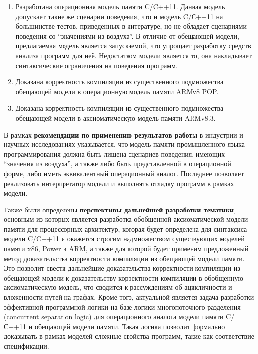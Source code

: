 \begin{enumerate}
  \item Разработана операционная модель памяти C/C++11.
    Данная модель допускает такие же сценарии поведения, что и модель C/С++11 на большинстве
    тестов, приведенных в литературе, но не обладает сценариями поведения со ``значениями из воздуха''.
    В отличие от обещающей модели, предлагаемая модель является запускаемой, что упрощает
    разработку средств анализа программ для неё. Недостатком модели является то,
    она накладывает синтаксические ограничения на поведения программ.
  \item Доказана корректность компиляции из существенного подмножества обещающей модели в операционную модель
    памяти ARMv8 POP.
  \item Доказана корректность компиляции из существенного подмножества обещающей модели в
    аксиоматическую модель памяти ARMv8.3.
\end{enumerate}

В рамках \textbf{рекомендации по применению результатов работы} в индустрии и научных исследованиях указывается,
что модель памяти промышленного языка программирования должна быть лишена сценариев поведения, имеющих ``значения из воздуха'',
а также либо быть представленной в операционной форме, либо иметь эквивалентный операционный аналог.
Последнее позволяет реализовать интерпретатор модели и выполнять отладку программ в рамках модели.

Также были определены \textbf{перспективы дальнейшей разработки тематики}, основным из которых является
разработка обобщенной аксиоматической модели памяти для процессорных архитектур, которая будет
определена для синтаксиса модели C/C++11 и окажется строгим надмножеством существующих моделей памяти
x86, Power и ARM, а также для которой будет применим предложенный метод доказательства корректности компиляции
из обещающей модели памяти. Это позволит свести дальнейшие доказательства корректности компиляции из
обещающей модели к доказательству корректности компиляции в обобщенную аксиоматическую модель, что
сводится к рассуждениям об ацикличности и вложенности путей на графах.
Кроме того, актуальной является задача разработки эффективной программной логики на базе логики многопоточного разделения
(concurrent separation logic) для операционного аналога модели памяти C/С++11 и обещающей модели памяти.
Такая логика позволит формально доказывать  в рамках моделей сложные свойства программ, такие как соответствие спецификации.
